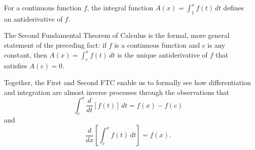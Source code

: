 

\begin{summary}
\item For a continuous function $f$, the integral function $A(x) = \int_1^x f(t) \, dt$ defines an antiderivative of $f$.
\item The Second Fundamental Theorem of Calculus is the formal, more general statement of the preceding fact:  if $f$ is a continuous function and $c$ is any constant, then $A(x) = \int_c^x f(t) \, dt$ is the unique antiderivative of $f$ that satisfies $A(c) = 0$.
\item Together, the First and Second FTC enable us to formally see how differentiation and integration are almost inverse processes through the observations that
$$\int_c^x \frac{d}{dt} \left[ f(t) \right] \, dt = f(x) - f(c)$$
and
$$\frac{d}{dx} \left[ \int_c^x f(t) \, dt \right] = f(x).$$

\end{summary}

\nin \hrulefill

 

\clearpage
